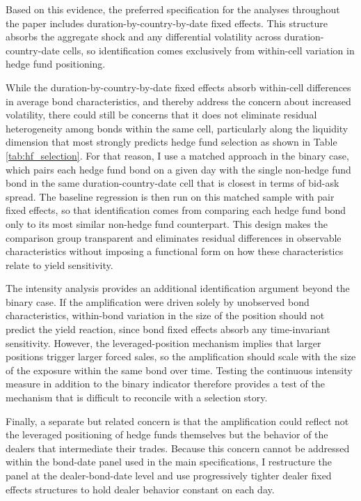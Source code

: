 \documentclass[english, 11pt, oneside]{article}
\begin{document}
Based on this evidence, the preferred specification for the analyses throughout the paper includes duration-by-country-by-date fixed effects. This structure absorbs the aggregate shock and any differential volatility across duration-country-date cells, so identification comes exclusively from within-cell variation in hedge fund positioning. 

While the duration-by-country-by-date fixed effects absorb within-cell differences in average bond characteristics, and thereby address the concern about increased volatility, there could still be concerns that it does not eliminate residual heterogeneity among bonds within the same cell, particularly along the liquidity dimension that most strongly predicts hedge fund selection as shown in Table \ref{tab:hf_selection}. For that reason, I use a matched approach in the binary case, which pairs each hedge fund bond on a given day with the single non-hedge fund bond in the same duration-country-date cell that is closest in terms of bid-ask spread. The baseline regression is then run on this matched sample with pair fixed effects, so that identification comes from comparing each hedge fund bond only to its most similar non-hedge fund counterpart. This design makes the comparison group transparent and eliminates residual differences in observable characteristics without imposing a functional form on how these characteristics relate to yield sensitivity.

The intensity analysis provides an additional identification argument beyond the binary case. If the amplification were driven solely by unobserved bond characteristics, within-bond variation in the size of the position should not predict the yield reaction, since bond fixed effects absorb any time-invariant sensitivity. However, the leveraged-position mechanism implies that larger positions trigger larger forced sales, so the amplification should scale with the size of the exposure within the same bond over time. Testing the continuous intensity measure in addition to the binary indicator therefore provides a test of the mechanism that is difficult to reconcile with a selection story.

Finally, a separate but related concern is that the amplification could reflect not the leveraged positioning of hedge funds themselves but the behavior of the dealers that intermediate their trades. Because this concern cannot be addressed within the bond-date panel used in the main specifications, I restructure the panel at the dealer-bond-date level and use progressively tighter dealer fixed effects structures to hold dealer behavior constant on each day.
\end{document}
